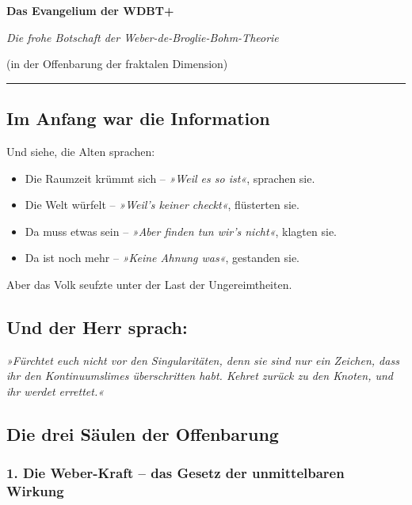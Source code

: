 \documentclass[10pt,a5paper]{article}
\begin{document}
\begin{center}
    {\Huge\bfseries Das Evangelium der WDBT+}
    
    \vspace{0.2cm}
    {\large\itshape Die frohe Botschaft der Weber-de-Broglie-Bohm-Theorie}
    
    \vspace{0.1cm}
    {\small (in der Offenbarung der fraktalen Dimension)}
\end{center}

\vspace{0.3cm}
\hrule
\vspace{0.3cm}

\subsection*{Im Anfang war die Information}

Und siehe, die Alten sprachen:
\begin{itemize}
    \item Die Raumzeit krümmt sich – \textit{»Weil es so ist«}, sprachen sie.
    \item Die Welt würfelt – \textit{»Weil's keiner checkt«}, flüsterten sie.
    \item Da muss etwas sein – \textit{»Aber finden tun wir's nicht«}, klagten sie.
    \item Da ist noch mehr – \textit{»Keine Ahnung was«}, gestanden sie.
\end{itemize}

Aber das Volk seufzte unter der Last der Ungereimtheiten.

\subsection*{Und der Herr sprach:}

\textit{»Fürchtet euch nicht vor den Singularitäten, denn sie sind nur ein Zeichen, dass ihr den Kontinuumslimes überschritten habt. Kehret zurück zu den Knoten, und ihr werdet errettet.«}

\subsection*{Die drei Säulen der Offenbarung}

\subsubsection*{1. Die Weber-Kraft – das Gesetz der unmittelbaren Wirkung}
\end{document}
